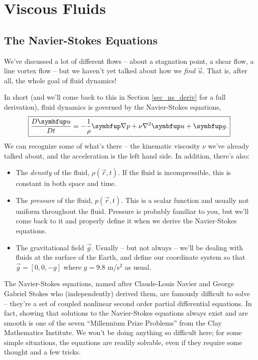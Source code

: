 \chapter{Viscous Fluids}

%
% 

\section{The Navier-Stokes Equations}

We've discussed a lot of different flows -- about a stagnation point, a shear flow, a line vortex flow -- but we haven't yet talked about how we \emph{find} $\vec{u}$.  That is, after all, the whole goal of fluid dynamics!

In short (and we'll come back to this in Section \ref{sec_ns_deriv} for a full derivation), fluid dynamics is governed by the Navier-Stokes equations,
\begin{equation}
\boxed{
\frac{D \vec{u}}{Dt} = -\frac{1}{\rho} \grad p + \nu \nabla^2 \vec{u} +  \vec{g}.
}
\end{equation}
We can recognize some of what's there -- the kinematic viscosity $\nu$ we've already talked about, and the acceleration is the left hand side.  In addition, there's also:
\begin{itemize}
\item The \emph{density} of the fluid, $\rho(\vec{r}, t)$.  If the fluid is incompressible, this is constant in both space and time.
\item The \emph{pressure} of the fluid, $p(\vec{r}, t)$.  This is a scalar function and usually not uniform throughout the fluid.  Pressure is probably familiar to you, but we'll come back to it and properly define it when we derive the Navier-Stokes equations.
\item The gravitational field $\vec{g}$.  Usually -- but not always -- we'll be dealing with fluids at the surface of the Earth, and define our coordinate system so that $\vec{g} = [0,0,-g]$ where $g = 9.8$ m/s$^2$ as usual. 
\end{itemize}

The Navier-Stokes equations, named after Claude-Louis Navier and George Gabriel Stokes who (independently) derived them, are famously difficult to solve -- they're a set of coupled nonlinear second order partial differential equations.  In fact, showing that solutions to the Navier-Stokes equations always exist and are smooth is one of the seven ``Millennium Prize Problems'' from the Clay Mathematics Institute.  We won't be doing anything so difficult here; for some simple situations, the equations are readily solvable, even if they require some thought and a few tricks.

